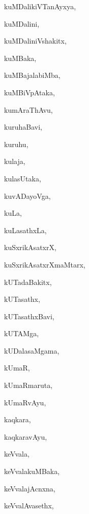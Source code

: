 \begin{multicols}{3}
{\noindent
{kuMDalikiVTanAyxya}, \pageref{kuMDalikiVTanAyxya}

\noindent
{kuMDalini}, \pageref{kuMDalini}

\noindent
{kuMDaliniVshakitx}, \pageref{kuMDaliniVshakitx}

\noindent
{kuMBaka}, \pageref{kuMBaka}

\noindent
{kuMBajalabiMba}, \pageref{kuMBajalabiMba}

\noindent
{kuMBiVpAtaka}, \pageref{kuMBiVpAtaka}

\noindent
{kumAraThAvu}, \pageref{kumAraThAvu}

\noindent
{kuruhaBavi}, \pageref{kuruhaBavi}

\noindent
{kuruhu}, \pageref{kuruhu}

\noindent
{kulaja}, \pageref{kulaja}

\noindent
{kulasUtaka}, \pageref{kulasUtaka}

\noindent
{kuvADayoVga}, \pageref{kuvADayoVga}

\noindent
{kuLa}, \pageref{kuLa}

\noindent
{kuLasathxLa}, \pageref{kuLasathxLa}

\noindent
{kuSxrikAsatxrX}, \pageref{kuSxrikAsatxrX}

\noindent
{kuSxrikAsatxrXmaMtarx}, \pageref{kuSxrikAsatxrXmaMtarx}

\noindent
{kUTadaBakitx}, \pageref{kUTadaBakitx}

\noindent
{kUTasathx}, \pageref{kUTasathx}

\noindent
{kUTasathxBavi}, \pageref{kUTasathxBavi}

\noindent
{kUTAMga}, \pageref{kUTAMga}

\noindent
{kUDalasaMgama}, \pageref{kUDalasaMgama}

\noindent
{kUmaR}, \pageref{kUmaR}

\noindent
{kUmaRmaruta}, \pageref{kUmaRmaruta}

\noindent
{kUmaRvAyu}, \pageref{kUmaRvAyu}

\noindent
{kaqkara}, \pageref{kaqkara}

\noindent
{kaqkaravAyu}, \pageref{kaqkaravAyu}

\noindent
{keVvala}, \pageref{keVvala}

\noindent
{keVvalakuMBaka}, \pageref{keVvalakuMBaka}

\noindent
{keVvalajAcnxna}, \pageref{keVvalajAcnxna}

\noindent
{keVvalAvasethx}, \pageref{keVvalAvasethx}

}
\end{multicols}
